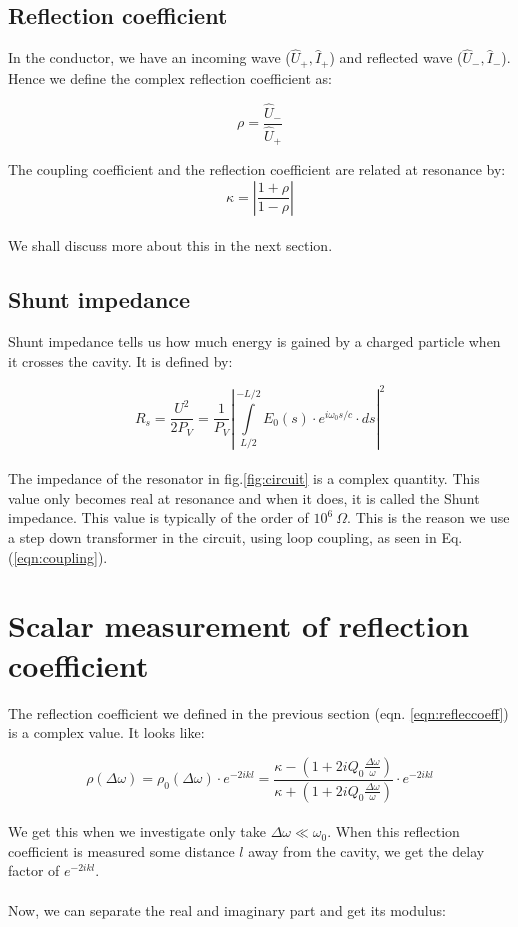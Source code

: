 \documentclass[a4paper]{report}
\numberwithin{equation}{section}
\begin{document}
\subsection{Reflection coefficient}
In the conductor, we have an incoming wave ($\hat{U}_{+}, \hat{I}_{+}$) and
reflected wave ($\hat{U}_{-}, \hat{I}_{-}$). Hence we define the complex
reflection coefficient as:

\begin{equation} \label{eqn:refleccoeff}
		\rho = \frac{\hat{U}_{-}}{\hat{U}_{+}}
\end{equation}

The coupling coefficient and the reflection coefficient are related at resonance
by: 
\\
\begin{equation}
		\kappa = \left|\frac{1 + \rho}{1 - \rho} \right| 
\end{equation}
\\
We shall discuss more about this in the next section.

\subsection{Shunt impedance}
Shunt impedance tells us how much energy is gained by a charged particle when it
crosses the cavity. It is defined by: 

\begin{equation} \label{eqn:shunt}
		R_{s} = \frac{U^2}{2 P_{V}} = \frac{1}{P_{V}} \left|\int\limits_{L/2}^{-L/2} E_{0}\left(s \right) \cdot e^{i \omega_{0}s/c}\cdot ds \right|^2 
\end{equation}
\\
The impedance of the resonator in fig.\ref{fig:circuit} is a complex quantity. This value only becomes real at resonance and when it does, it is called the Shunt impedance. This value is typically of the order of $10^{6} \  \Omega$. This is the reason we use a step down transformer in the circuit, using loop coupling, as seen in Eq.(\ref{eqn:coupling}). 

\section{Scalar measurement of reflection coefficient}
The reflection coefficient we defined in the previous section (eqn. \ref{eqn:refleccoeff}) is a complex value. It looks like:

\[
		\rho(\Delta \omega) = \rho_{0} (\Delta \omega) \cdot e^{-2ikl} = \frac{\kappa - \left(1 + 2iQ_{0}\frac{\Delta \omega}{\omega}\right)}{\kappa + \left(1 + 2iQ_{0}\frac{\Delta \omega}{\omega}\right)} \cdot e^{-2ikl}
\]
\\
We get this when we investigate only take $\Delta \omega \ll \omega_{0}$. When this reflection coefficient is measured some distance $l$ away from the cavity, we get the delay factor of $e^{-2ikl}$.
\\ \\
Now, we can separate the real and imaginary part and get its modulus: 
\end{document}
